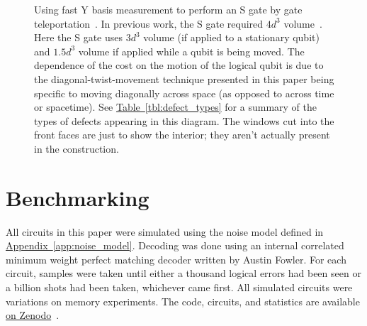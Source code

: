 \documentclass[onecolumn,unpublished,a4paper]{quantumarticle}
\theoremstyle{definition}
\theoremstyle{definition}
\theoremstyle{definition}
\DeclareRobustCommand{\app}[1]{\hyperref[app:#1]{Appendix~\ref*{app:#1}}}
\newcommand{\tbl}[1]{\hyperref[tbl:#1]{Table~\ref*{tbl:#1}}}
\begin{document}
\begin{figure}
    \centering
    \caption{
        Using fast Y basis measurement to perform an S gate by gate teleportation~\cite{gottesman1999gateteleport}.
        In previous work, the S gate required $4 d^3$  volume~\cite{bombin2021logical,chamberland2022universal}.
        Here the S gate uses $3 d^3$ volume (if applied to a stationary qubit) and $1.5d^3$ volume if applied while a qubit is being moved.
        The dependence of the cost on the motion of the logical qubit is due to the diagonal-twist-movement technique presented in this paper being specific to moving diagonally across space (as opposed to across time or spacetime).
        See \tbl{defect_types} for a summary of the types of defects appearing in this diagram.
        The windows cut into the front faces are just to show the interior; they aren't actually present in the construction.
    }
    \label{fig:other_improvements}
\end{figure}





\section{Benchmarking}
\label{sec:benchmarking}

All circuits in this paper were simulated using the noise model defined in \app{noise_model}.
Decoding was done using an internal correlated minimum weight perfect matching decoder written by Austin Fowler.
For each circuit, samples were taken until either a thousand logical errors had been seen or a billion shots had been taken, whichever came first.
All simulated circuits were variations on memory experiments.
The code, circuits, and statistics are available \href{https://doi.org/10.5281/zenodo.7487893}{on Zenodo}~\cite{gidneyybasisdata2022}.
\end{document}
